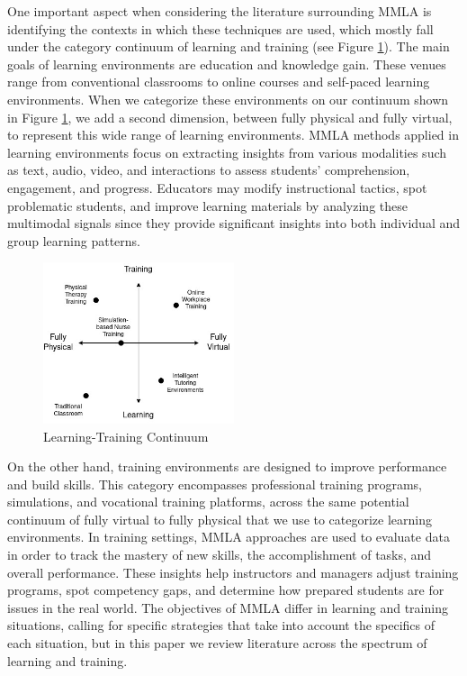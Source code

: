 \documentclass[manuscript,screen,review]{acmart}
\begin{document}
One important aspect when considering the literature surrounding MMLA is identifying the contexts in which these techniques are used, which mostly fall under the category continuum of learning and training (see Figure \ref{fig:ltcontinuum}). The main goals of learning environments are education and knowledge gain. These venues range from conventional classrooms to online courses and self-paced learning environments. When we categorize these environments on our continuum shown in Figure \ref{fig:ltcontinuum}, we add a second dimension, between fully physical and fully virtual, to represent this wide range of learning environments. MMLA methods applied in learning environments focus on extracting insights from various modalities such as text, audio, video, and interactions to assess students' comprehension, engagement, and progress. Educators may modify instructional tactics, spot problematic students, and improve learning materials by analyzing these multimodal signals since they provide significant insights into both individual and group learning patterns.

\begin{figure}
    \begin{center}
    \includegraphics[width=0.5\textwidth]{img/LearningTrainingContinuum.jpg}
    \end{center}
    \caption{Learning-Training Continuum}
    \label{fig:ltcontinuum}
\end{figure}


On the other hand, training environments are designed to improve performance and build skills. This category encompasses professional training programs, simulations, and vocational training platforms, across the same potential continuum of fully virtual to fully physical that we use to categorize learning environments. In training settings, MMLA approaches are used to evaluate data in order to track the mastery of new skills, the accomplishment of tasks, and overall performance. These insights help instructors and managers adjust training programs, spot competency gaps, and determine how prepared students are for issues in the real world. The objectives of MMLA differ in learning and training situations, calling for specific strategies that take into account the specifics of each situation, but in this paper we review literature across the spectrum of learning and training.
\end{document}
